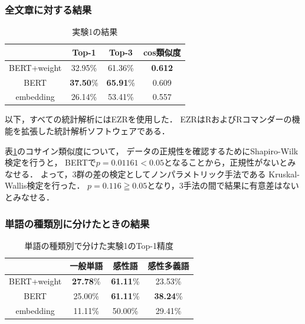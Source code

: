 		\subsubsection{全文章に対する結果}
			\begin{table}[H]
				\centering
				\caption{実験1の結果}
				\label{table:top-k_cos-sim_all}
					\begin{tabular}{cccc}
						\hline
						& Top-1 & Top-3 & cos類似度 \\
						\hline \hline
						BERT+weight & 32.95\% & 61.36\% & \textbf{0.612} \\
						BERT & \textbf{37.50}\% & \textbf{65.91}\% & 0.609 \\
						embedding & 26.14\% & 53.41\% & 0.557\\
						\hline
					\end{tabular}
			\end{table}

			以下，すべての統計解析にはEZR\cite{EZR}を使用した．
			EZRはRおよびRコマンダーの機能を拡張した統計解析ソフトウェアである．
			
			表\ref{table:top-k_cos-sim_all}のコサイン類似度について，
			データの正規性を確認するためにShapiro-Wilk検定\cite{shapiro_wilk_test}を行うと，
			BERTで$p=0.01161<0.05$となることから，正規性がないとみなせる．
			よって，3群の差の検定としてノンパラメトリック手法である
			Kruskal-Wallis検定\cite{kruskal_wallis_test}を行った．
			$p=0.116\geqq0.05$となり，3手法の間で結果に有意差はないとみなせる．
			
		\subsubsection{単語の種類別に分けたときの結果}
			\begin{table}[H]
				\centering
				\caption{単語の種類別で分けた実験1のTop-1精度}
				\label{table:top-1_hinshi}
					\begin{tabular}{cccc}
						\hline
						& 一般単語 & 感性語 & 感性多義語 \\
						\hline \hline
						BERT+weight & \textbf{27.78}\% & \textbf{61.11}\% & 23.53\% \\
						BERT & 25.00\% & \textbf{61.11}\% & \textbf{38.24}\% \\
						embedding & 11.11\% & 50.00\% & 29.41\% \\
						\hline
					\end{tabular}
			\end{table}

